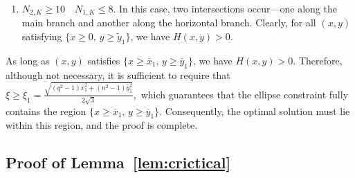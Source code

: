 \documentclass[journal,12pt,onecolumn,draftclsnofoot]{IEEEtran}
\theoremstyle{definition}
\begin{document}
\begin{enumerate}
For $\{(x,y)~|~x \le 9.6369\times 10^{-3},\, y \ge \tilde{y}_1\}$, we have $H(x,y) > 0$, and the corresponding solution, which is the intersection with $y$-axis,  is optimal.   
However, since $\tilde{x}_1 = 9.6369\times 10^{-3}\approx 0$, meaning that the solution lies near the boundary (the $y$-axis), which is not of practical interest, as noted in Remark~\ref{rem:smallroot}.  
Therefore, in this case, we consider the same feasible region as before, i.e., $\{(x,y)~|~x \ge \bar{x}_1,\, y \ge \bar{y}_1\}$, where $\bar{x}_1 = 0.2484$ and the $\bar{y}_1$ comes from $g_q(0.2484,\bar{y}_1)=0$. 
For $N_{2,K}=9$, although $P^{(1)}_{N{2,K}}(y)$ possesses two positive roots, substitution into $g_q(x,y)=0$ yields no positive solutions.
Consequently, no horizontal branch appears, and the preceding arguments remain valid in this case.


\item {$N_{2,K} \ge 10$~~$N_{1,K} \leq 8$.}  In this case, two intersections occur—one along the main branch and another along the horizontal branch.   Clearly, for all $(x,y)$ satisfying $\{x \ge 0,\, y \ge \tilde{y}_1\}$, we have $H(x,y) > 0$.

\end{enumerate}
As long as $(x,y)$ satisfies $\{x \ge \bar{x}_1,\, y \ge \bar{y}_1\}$, we have $H(x,y) > 0$.  
Therefore, although not necessary, it is sufficient to require that  $\xi \ge \xi_1 =  \frac{\sqrt{(q^2 - 1)\bar{x}_1^2 + (n^2 - 1)\bar{y}_1^2}}{2\sqrt{3}},$ which guarantees that the ellipse constraint fully contains the region $\{x \ge \bar{x}_1,\, y \ge \bar{y}_1\}$.   Consequently, the optimal solution must lie within this region, and the proof is complete.





\subsection{Proof of Lemma~\ref{lem:crictical}}\label{ap:crictical}
\end{document}
